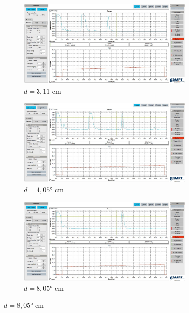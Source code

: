 \begin{figure}
  \centering
  \begin{subfigure}{0.7\textwidth}
    \centering
    \includegraphics[width=0.95\textwidth]{screens/311.jpg}
    \caption{$d = 3,11$ cm}
    \label{fig:0-deg}
  \end{subfigure}

  \begin{subfigure}{0.7\textwidth}
    \centering
    \includegraphics[width=0.95\textwidth]{screens/405.jpg}
    \caption{$d = 4,05°$ cm}
    \label{fig:45-deg}
  \end{subfigure}

  \begin{subfigure}{0.7\textwidth}
    \centering
    \includegraphics[width=0.95\textwidth]{screens/805.jpg}
    \caption{$d = 8,05°$ cm}
    \label{fig:90-deg}
  \end{subfigure}


\end{figure}
